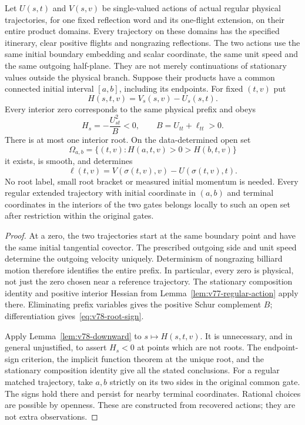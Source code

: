 \begin{theorem}
\label{thm:v78-root-free}
Let $U(s,t)$ and $V(s,v)$ be single-valued actions of actual regular
physical trajectories, for one fixed reflection word and its one-flight
extension, on their entire product domains.  Every trajectory on these
domains has the specified itinerary, clear positive flights and
nongrazing reflections.  The two actions use the same initial boundary
embedding and scalar coordinate, the same unit speed and the same
outgoing half-plane.  They are not merely continuations of stationary
values outside the physical branch.  Suppose their products have a
common connected initial interval $[a,b]$, including its endpoints.  For fixed $(t,v)$ put
\[
 H(s,t,v)=V_s(s,v)-U_s(s,t).
\]
Every interior zero corresponds to the same physical prefix and obeys
\begin{equation}\label{eq:v78-root-sign}
 H_s=-\frac{U_{st}^2}{B}<0,\qquad B=U_{tt}+\ell_{tt}>0.
\end{equation}
There is at most one interior root.  On the data-determined open set
\[
 \Omega_{a,b}=\{(t,v):H(a,t,v)>0>H(b,t,v)\}
\]
it exists, is smooth, and determines
\[
 \ell(t,v)=V(\sigma(t,v),v)-U(\sigma(t,v),t).
\]
No root label, small root bracket or measured initial momentum is needed.
Every regular extended trajectory with initial coordinate in $(a,b)$
and terminal coordinates in the interiors of the two gates belongs
locally to such an open set after restriction within the original gates.
\end{theorem}
\begin{proof}
At a zero, the two trajectories start at the same boundary point and
have the same initial tangential covector.  The prescribed outgoing side
and unit speed determine the outgoing velocity uniquely.  Determinism
of nongrazing billiard motion therefore identifies the entire prefix.
In particular, every zero is physical, not just the zero chosen near a
reference trajectory.  The stationary composition identity and positive
interior Hessian from Lemma~\ref{lem:v77-regular-action} apply there.
Eliminating prefix variables gives the positive Schur complement $B$;
differentiation gives~\eqref{eq:v78-root-sign}.

Apply Lemma~\ref{lem:v78-downward} to $s\mapsto H(s,t,v)$.  It is
unnecessary, and in general unjustified, to assert $H_s<0$ at points
which are not roots.  The endpoint-sign criterion, the implicit function
theorem at the unique root, and the stationary composition identity give
all the stated conclusions.  For a regular matched trajectory, take
$a,b$ strictly on its two sides in the original common gate.  The signs
hold there and persist for nearby terminal coordinates.  Rational
choices are possible by openness.  These are constructed from recovered
actions; they are not extra observations.
\end{proof}

